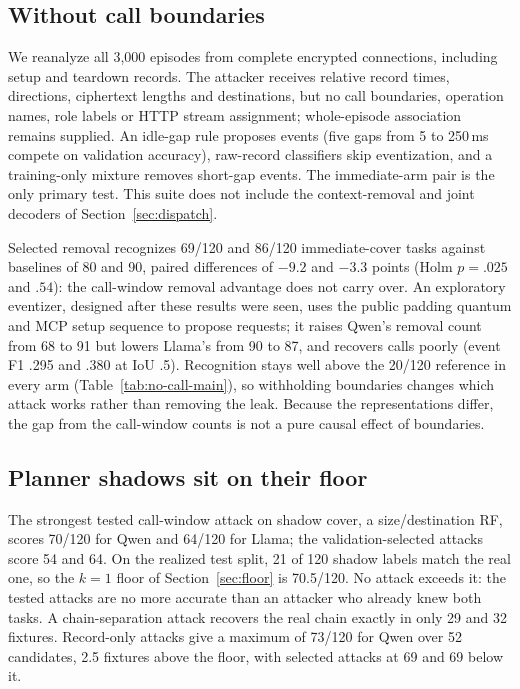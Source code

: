 \subsection{Without call boundaries}\label{sec:noboundary}
We reanalyze all 3,000 episodes from complete encrypted connections, including setup and teardown records. The attacker receives relative record times, directions, ciphertext lengths and destinations, but no call boundaries, operation names, role labels or HTTP stream assignment; whole-episode association remains supplied. An idle-gap rule proposes events (five gaps from 5 to 250\,ms compete on validation accuracy), raw-record classifiers skip eventization, and a training-only mixture removes short-gap events. The immediate-arm pair is the only primary test. This suite does not include the context-removal and joint decoders of Section~\ref{sec:dispatch}.


Selected removal recognizes 69/120 and 86/120 immediate-cover tasks against baselines of 80 and 90, paired differences of $-9.2$ and $-3.3$ points (Holm $p=.025$ and $.54$): the call-window removal advantage does not carry over. An exploratory eventizer, designed after these results were seen, uses the public padding quantum and MCP setup sequence to propose requests; it raises Qwen's removal count from 68 to 91 but lowers Llama's from 90 to 87, and recovers calls poorly (event F1 .295 and .380 at IoU .5). Recognition stays well above the 20/120 reference in every arm (Table~\ref{tab:no-call-main}), so withholding boundaries changes which attack works rather than removing the leak. Because the representations differ, the gap from the call-window counts is not a pure causal effect of boundaries.

\subsection{Planner shadows sit on their floor}\label{sec:shadow}
The strongest tested call-window attack on shadow cover, a size/destination RF, scores 70/120 for Qwen and 64/120 for Llama; the validation-selected attacks score 54 and 64. On the realized test split, 21 of 120 shadow labels match the real one, so the $k=1$ floor of Section~\ref{sec:floor} is 70.5/120. No attack exceeds it: the tested attacks are no more accurate than an attacker who already knew both tasks. A chain-separation attack recovers the real chain exactly in only 29 and 32 fixtures. Record-only attacks give a maximum of 73/120 for Qwen over 52 candidates, 2.5 fixtures above the floor, with selected attacks at 69 and 69 below it.

